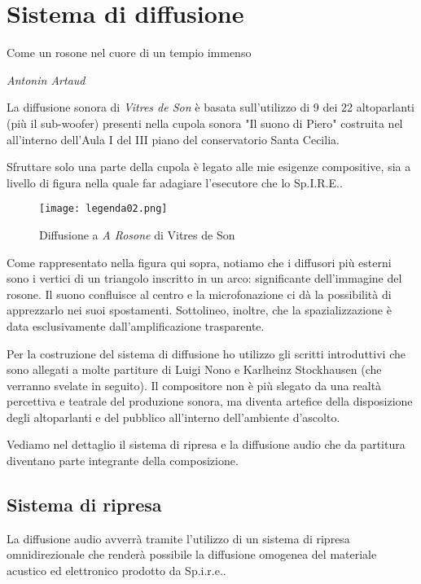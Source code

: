 
\chapter{Sistema di diffusione}
\label{chp:Sistema di diffusione}

\epigraph{Come un rosone nel cuore di un tempio immenso}{\textit{Antonin Artaud}}

La diffusione sonora di \emph{Vitres de Son} è basata sull'utilizzo di 9 dei 22 altoparlanti (più il sub-woofer) presenti nella cupola sonora "Il suono di Piero" costruita nel all'interno dell'Aula I del III piano del conservatorio Santa Cecilia.

Sfruttare solo una parte della cupola è legato alle mie esigenze compositive, sia a livello di figura nella quale far adagiare l'esecutore che lo Sp.I.R.E..

\begin{figure}[htbp]
\begin{center}
\texttt{[image: legenda02.png]}
\caption{Diffusione a \textit{A Rosone} di Vitres de Son}
\label{default}
\end{center}
\end{figure}

Come rappresentato nella figura qui sopra, notiamo che i diffusori più esterni sono i vertici di un triangolo inscritto in un arco: significante dell'immagine del rosone. Il suono confluisce al centro e la microfonazione ci dà la possibilità di apprezzarlo nei suoi spostamenti. Sottolineo, inoltre, che la spazializzazione è data esclusivamente dall'amplificazione trasparente.

Per la costruzione del sistema di diffusione ho utilizzo gli scritti introduttivi che sono allegati a molte partiture di Luigi Nono e Karlheinz Stockhausen (che verranno svelate in seguito). Il compositore non è più slegato da una realtà percettiva e teatrale del produzione sonora, ma diventa artefice della disposizione degli altoparlanti e del pubblico all'interno dell'ambiente d'ascolto.

Vediamo nel dettaglio il sistema di ripresa e la diffusione audio che da partitura diventano parte integrante della composizione.


\section{Sistema di ripresa}
La diffusione audio avverrà tramite l'utilizzo di un sistema di ripresa omnidirezionale che renderà possibile la diffusione omogenea del materiale acustico ed elettronico prodotto da Sp.i.r.e..

